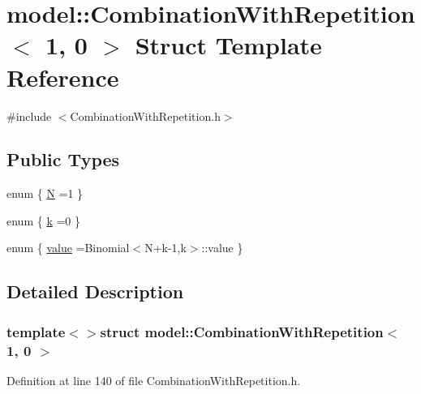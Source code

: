\hypertarget{structmodel_1_1_combination_with_repetition_3_011_00_010_01_4}{}\section{model\+:\+:Combination\+With\+Repetition$<$ 1, 0 $>$ Struct Template Reference}
\label{structmodel_1_1_combination_with_repetition_3_011_00_010_01_4}


{\ttfamily \#include $<$Combination\+With\+Repetition.\+h$>$}

\subsection*{Public Types}
\begin{DoxyCompactItemize}
\item 
enum \{ \hyperlink{structmodel_1_1_combination_with_repetition_3_011_00_010_01_4_a0b30c0fb95d48f101a9f7194ae3fc04baf41eab84837f056681f1856ad95ed115}{N} =1
 \}
\item 
enum \{ \hyperlink{structmodel_1_1_combination_with_repetition_3_011_00_010_01_4_a022356e50abf5b3dc31b6ca0cc4f94b0adfcb19e51a70d344f2481469eb235472}{k} =0
 \}
\item 
enum \{ \hyperlink{structmodel_1_1_combination_with_repetition_3_011_00_010_01_4_a5d969386fa7719bb8077444d429e3f28a912fc8866193157c5c5d9a5754f7f426}{value} =Binomial$<$N+k-\/1,k$>$\+:\+:value
 \}
\end{DoxyCompactItemize}


\subsection{Detailed Description}
\subsubsection*{template$<$$>$struct model\+::\+Combination\+With\+Repetition$<$ 1, 0 $>$}



Definition at line 140 of file Combination\+With\+Repetition.\+h.



